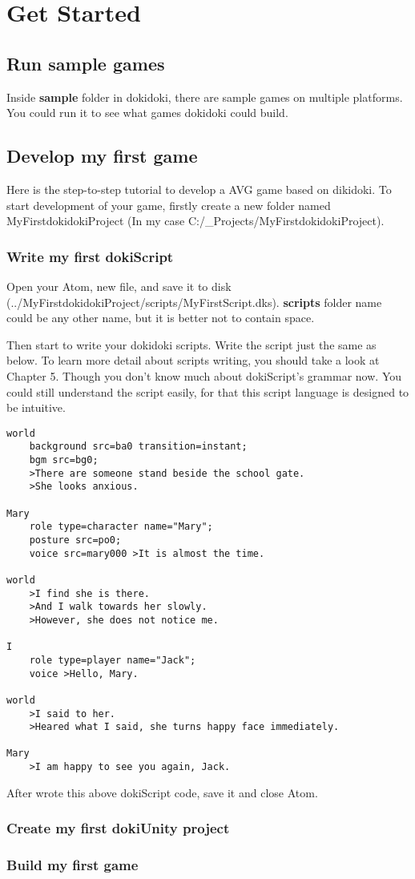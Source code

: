 \chapter{Get Started}

\section{Run sample games}

Inside \textbf{sample} folder in dokidoki, there are sample games on multiple platforms. You could run it to see what games dokidoki could build.

\section{Develop my first game}

Here is the step-to-step tutorial to develop a AVG game based on dikidoki. To start development of your game, firstly create a new folder named MyFirstdokidokiProject (In my case C:/\_Projects/MyFirstdokidokiProject).

\subsection{Write my first dokiScript}

Open your Atom, new file, and save it to disk (../MyFirstdokidokiProject/scripts/MyFirstScript.dks). \textbf{scripts} folder name could be any other name, but it is better not to contain space.

Then start to write your dokidoki scripts. Write the script just the same as below. To learn more detail about scripts writing, you should take a look at Chapter 5. Though you don't know much about dokiScript's grammar now. You could still understand the script easily, for that this script language is designed to be intuitive. 

\begin{lstlisting}
world
	background src=ba0 transition=instant;
	bgm src=bg0;
	>There are someone stand beside the school gate.
	>She looks anxious.

Mary
	role type=character name="Mary";
	posture src=po0;
	voice src=mary000 >It is almost the time.

world
	>I find she is there.
	>And I walk towards her slowly.
	>However, she does not notice me.

I
	role type=player name="Jack";
	voice >Hello, Mary.

world
	>I said to her.
	>Heared what I said, she turns happy face immediately.

Mary
	>I am happy to see you again, Jack.
\end{lstlisting}

After wrote this above dokiScript code, save it and close Atom.

\subsection{Create my first dokiUnity project}



\subsection{Build my first game}
